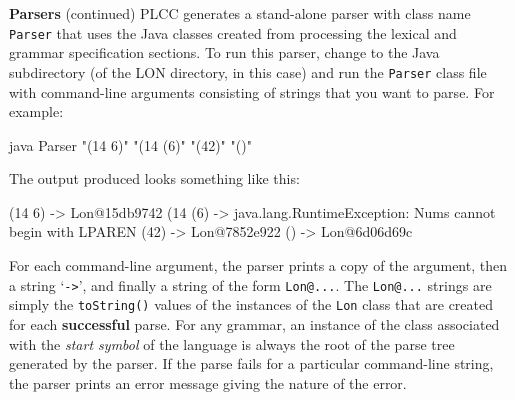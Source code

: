 \begin{minipage}[t]{\sw}
\slidenumber
\LARGE
{\bf Parsers} (continued)\exx
\Large
\emm\LightBox{\MYlonGrammarOnly}\exx
PLCC generates a stand-alone parser with class name \verb'Parser'
that uses the Java classes
created from processing the lexical and grammar specification sections.
To run this parser,
change to the Java subdirectory (of the LON directory, in this case)
and run the \verb'Parser' class file with command-line arguments
consisting of strings that you want to parse.
For example:
\begin{qv}
java Parser "(14 6)" "(14 (6)" "(42)" "()"
\end{qv}
The output produced looks something like this:
\begin{qv}
(14 6) -> Lon@15db9742
(14 (6) -> java.lang.RuntimeException: Nums cannot begin with LPAREN
(42) -> Lon@7852e922
() -> Lon@6d06d69c
\end{qv}
For each command-line argument,
the parser prints a copy of the argument,
then a string `\verb'->'',
and finally a string of the form \verb'Lon@...'.\exx
The \verb'Lon@...' strings are simply the \verb'toString()' values
of the instances of the \verb'Lon' class
that are created for each {\bf successful} parse.
For any grammar, an instance of the class associated
with the {\em start symbol} of the language
is always the root of the parse tree generated by the parser.
If the parse fails for a particular command-line string,
the parser prints an error message giving the nature of the error.
\end{minipage}
\clearpage
